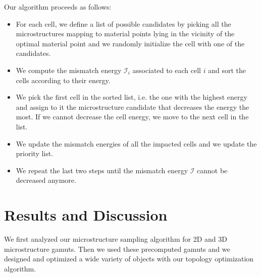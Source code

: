 Our algorithm proceeds as follows:
\begin{itemize}
\item For each cell, we define a list of possible candidates by picking all the microstructures mapping to material points lying in the vicinity of the optimal material point and we randomly initialize the cell with one of the candidates.
\item We compute the mismatch energy $\mathcal{I}_i$ associated to each cell $i$ and sort the cells according to their energy. 
\item We pick the first cell in the sorted list, i.e. the one with the highest energy and assign to it the microstructure candidate that decreases the energy the most. If we cannot decrease the cell energy, we move to the next cell in the list.
\item We update the mismatch energies of all the impacted cells and we update the priority list.
\item We repeat the last two steps until the mismatch energy $\mathcal{I}$ cannot be decreased anymore.
\end{itemize}

\section{Results and Discussion}
We first analyzed our microstructure sampling algorithm for 2D and 3D microstructure gamuts. Then we used these precomputed gamuts and we designed and optimized a wide variety of objects with our topology optimization algorithm.
